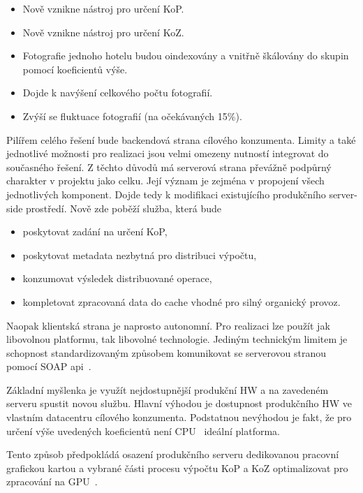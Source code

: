 \begin{itemize}
	\setlength{\parskip}{0pt}
	\setlength{\itemsep}{0pt}
	\item {Nově vznikne nástroj pro určení KoP.}
	\item {Nově vznikne nástroj pro určení KoZ.}
	\item {Fotografie jednoho hotelu budou oindexovány a vnitřně škálovány do skupin pomocí koeficientů výše.}
	\item {Dojde k navýšení celkového počtu fotografií.}
	\item {Zvýší se fluktuace fotografií (na očekávaných 15\%).}
\end{itemize}

Pilířem celého řešení bude backendová strana cílového konzumenta. Limity a také jednotlivé možnosti pro realizaci jsou velmi omezeny nutností integrovat do současného řešení. Z těchto důvodů má serverová strana převážně podpůrný charakter v projektu jako celku. Její význam je zejména v propojení všech jednotlivých komponent. Dojde tedy k modifikaci existujícího produkčního server-side prostředí. Nově zde poběží služba, která bude
\begin{itemize}
	\setlength{\parskip}{0pt}
	\setlength{\itemsep}{0pt}
	\item {poskytovat zadání na určení KoP,}
	\item {poskytovat metadata nezbytná pro distribuci výpočtu,}
	\item {konzumovat výsledek distribuované operace,}
	\item {kompletovat zpracovaná data do cache vhodné pro silný organický provoz.}
\end{itemize}
Naopak klientská strana je naprosto autonomní. Pro realizaci lze použít jak libovolnou platformu, tak libovolné technologie. Jediným technickým limitem je schopnost standardizovaným způsobem komunikovat se serverovou stranou pomocí SOAP api~\cite{soap}.

Základní myšlenka je využít nejdostupnější produkční HW a na zavedeném serveru spustit novou službu. Hlavní výhodou je dostupnost produkčního HW ve vlastním datacentru cílového konzumenta. Podstatnou nevýhodou je fakt, že pro určení výše uvedených koeficientů není CPU~\cite{cpu} ideální platforma.

Tento způsob předpokládá osazení produkčního serveru dedikovanou pracovní grafickou kartou a vybrané části procesu výpočtu KoP a KoZ optimalizovat pro zpracování na GPU~\cite{gpu}.

